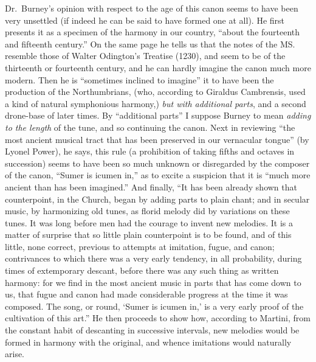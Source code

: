 Dr.~Burney’s opinion with respect to the age of this canon seems to have been
very unsettled (if indeed he can be said to have formed one at all). He first
presents it as a specimen of the harmony \pagebreak
in our country, “about the fourteenth 
and fifteenth century.” On the same page he tells us that the notes of the 
MS. resemble those of Walter Odington’s Treatise %
(1230), and seem to be of the
thirteenth or fourteenth century, and he can hardly imagine the canon much
more modern. Then he is “sometimes inclined to imagine” it to have been
the production of the Northumbrians, (who, according to Giraldus Cambrensis,
used a kind of natural symphonious harmony,) \textit{but with additional parts}, and a
second drone-base of later times. By “additional parts” I suppose Burney
to mean \textit{adding to the length} of the tune, and so continuing the canon. Next
in reviewing “the most ancient musical tract that has been preserved in our
vernacular tongue” (by Lyonel Power), he says, this rule (a prohibition of
taking fifths and octaves in succession) seems to have been so much unknown
or disregarded by the composer of the canon, “Sumer is icumen in,” as to
excite a suspicion that it is “much more ancient than has been imagined.”
And finally, “It has been already shown that counterpoint, in the Church,
began by adding parts to plain chant; and in secular music, by harmonizing
old tunes, as florid melody did by variations on these tunes. It was long
before men had the courage to invent new melodies. It is a matter of surprise
that so little plain counterpoint is to be found, and of this little, none
correct, previous to attempts at imitation, fugue, and canon; contrivances to which
there was a very early tendency, in all probability, during times of extemporary
descant, before there was any such thing as written harmony: for we find in the
most ancient music in parts that has come down to us, that fugue and canon had
made considerable progress at the time it was composed. The song, or round,
‘Sumer is icumen in,’ is a very early proof of the cultivation of this art.” He
then proceeds to show how, according to Martini, from the constant habit of
descanting in successive intervals, new melodies would be formed in harmony with
the original, and whence imitations would naturally arise.

